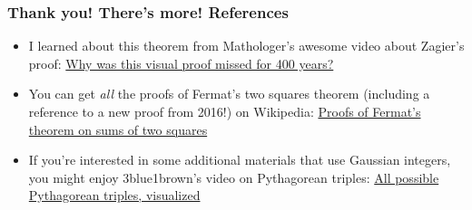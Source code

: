 \documentclass{beamer}
\begin{document}
\begin{frame}
	\frametitle{Thank you! There's more! References}

	\begin{itemize}
		\item I learned about this theorem from Mathologer's awesome video about Zagier's proof:
		\href{https://www.youtube.com/watch?v=DjI1NICfjOk}{Why was this visual proof missed
		for 400 years?}

	\item You can get {\em all} the proofs of Fermat's two squares theorem (including
	a reference to a new proof from 2016!) on Wikipedia:
	\href{https://bit.ly/3gpMy7x}{Proofs of Fermat's theorem on sums of two squares}
	
	\item If you're interested in some additional materials that use Gaussian integers, you might
	enjoy 3blue1brown's video on Pythagorean triples:
	\href{https://www.youtube.com/watch?v=QJYmyhnaaek}{All possible Pythagorean triples, visualized}
	\end{itemize}
\end{frame}
\end{document}
